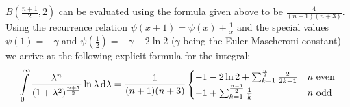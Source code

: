 $B(\tfrac{n+1}{2}, 2)$ can be evaluated using the formula given above to be
$\tfrac{4}{(n+1)(n+3)}$. Using the recurrence relation $\psi(x + 1) = \psi(x) +
\frac{1}{x}$ and the special values $\psi(1) = -\gamma$ and $\psi(\tfrac{1}{2})
= -\gamma - 2\ln 2$ ($\gamma$ being the Euler-Mascheroni constant) we arrive at
the following explicit formula for the integral:
\begin{align*}
    \Integ[\infty]{0}{\lambda}{\frac{\lambda^n}{(1 +
    \lambda^2)^{\frac{n+5}{2}}}\ln{\lambda}} = \frac{1}{(n+1)(n+3)}
        \begin{cases} 
            -1 - 2\ln 2 + \sum_{k=1}^{\frac n 2}\frac{2}{2k - 1} & n\text{
            even} \\
            -1 + \sum_{k=1}^{\frac{n-1}{2}}\frac 1 k & n\text{ odd}
        \end{cases}
\end{align*}
